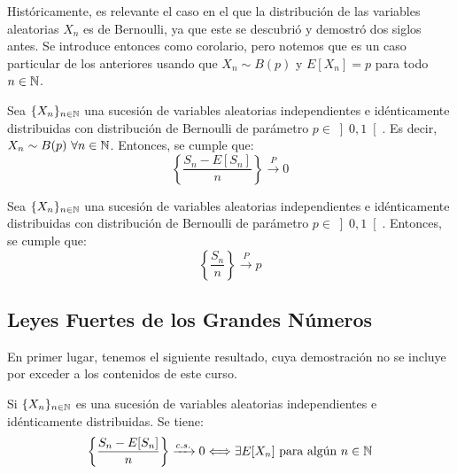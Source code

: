 Históricamente, es relevante el caso en el que la distribución de las variables aleatorias $X_n$ es de Bernoulli, ya que este se descubrió y demostró dos siglos antes. Se introduce entonces como corolario, pero notemos que es un caso particular de los anteriores usando que $X_n\sim B(p)$ y $E[X_n]=p$ para todo $n\in \mathbb{N}$.

\begin{coro}
    Sea $\{X_n\}_{n\in \mathbb{N}}$ una sucesión de variables aleatorias independientes e idénticamente distribuidas con distribución de Bernoulli de parámetro $p\in \left]0,1\right[$. Es decir, $X_n\sim B(p)~\forall n\in \mathbb{N}$. Entonces, se cumple que:
    \begin{equation*}
        \left\{\frac{S_n-E[S_n]}{n}\right\} \xrightarrow{P} 0
    \end{equation*}
\end{coro}
\begin{coro}
    Sea $\{X_n\}_{n\in \mathbb{N}}$ una sucesión de variables aleatorias independientes e idénticamente distribuidas con distribución de Bernoulli de parámetro $p\in \left]0,1\right[$. Entonces, se cumple que:
    \begin{equation*}
        \left\{\frac{S_n}{n}\right\} \xrightarrow{P} p
    \end{equation*}
\end{coro}


\subsection{Leyes Fuertes de los Grandes Números}

En primer lugar, tenemos el siguiente resultado, cuya demostración no se incluye por exceder a los contenidos de este curso.
\begin{prop}
    Si $\{X_n\}_{n\in \mathbb{N}}$ es una sucesión de variables aleatorias independientes e idénticamente distribuidas. Se tiene:
    \begin{equation*}
        \left\{\frac{S_n-E[S_n]}{n}\right\} \xrightarrow{c.s.} 0
        \Longleftrightarrow \exists E[X_n] \text{ para algún } n\in \mathbb{N}
    \end{equation*}
\end{prop}

